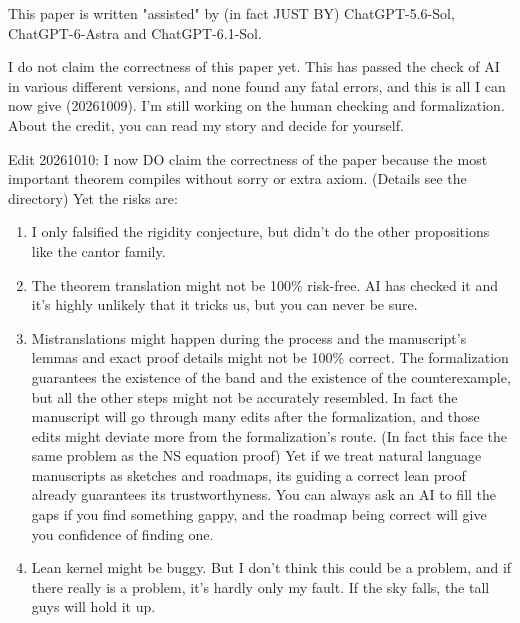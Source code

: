\documentclass[11pt]{amsart}
\theoremstyle{definition}
\theoremstyle{remark}
\numberwithin{equation}{section}
\begin{document}
This paper is written "assisted" by (in fact JUST BY) ChatGPT-5.6-Sol, ChatGPT-6-Astra and ChatGPT-6.1-Sol.

I do not claim the correctness of this paper yet. This has passed the check of AI in various different versions, and none found any fatal errors, and this is all I can now give (20261009). I'm still working on the human checking and formalization. About the credit, you can read my story and decide for yourself.

Edit 20261010: I now DO claim the correctness of the paper because the most important theorem compiles without sorry or extra axiom. (Details see the directory) Yet the risks are:
\begin{enumerate}
\item I only falsified the rigidity conjecture, but didn't do the other propositions like the cantor family.
\item The theorem translation might not be 100\% risk-free. AI has checked it and it's highly unlikely that it tricks us, but you can never be sure.
\item Mistranslations might happen during the process and the manuscript's lemmas and exact proof details might not be 100\% correct. The formalization guarantees the existence of the band and the existence of the counterexample, but all the other steps might not be accurately resembled. In fact the manuscript will go through many edits after the formalization, and those edits might deviate more from the formalization's route. (In fact this face the same problem as the NS equation proof) Yet if we treat natural language manuscripts as sketches and roadmaps, its guiding a correct lean proof already guarantees its trustworthyness. You can always ask an AI to fill the gaps if you find something gappy, and the roadmap being correct will give you confidence of finding one.
\item Lean kernel might be buggy. But I don't think this could be a problem, and if there really is a problem, it's hardly only my fault. If the sky falls, the tall guys will hold it up.

\end{enumerate}
\end{document}
